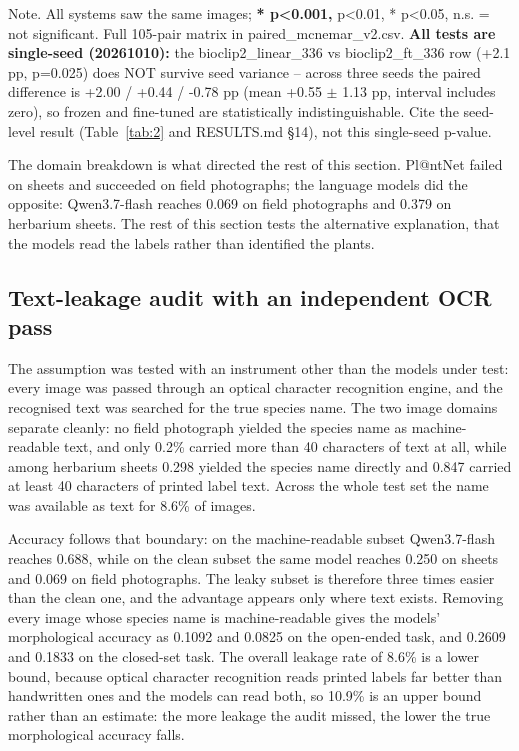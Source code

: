 \documentclass[preprint,12pt,authoryear]{elsarticle}
\begin{document}
\begin{table}[tbp]
\begin{minipage}{\linewidth}
Note. All systems saw the same images; \textbf{* p\textless{}0.001, } p\textless{}0.01, * p\textless{}0.05, n.s. = not significant. Full 105-pair matrix in paired\_mcnemar\_v2.csv. \textbf{All tests are single-seed (20261010):} the bioclip2\_linear\_336 vs bioclip2\_ft\_336 row (+2.1 pp, p=0.025) does NOT survive seed variance -- across three seeds the paired difference is +2.00 / +0.44 / -0.78 pp (mean +0.55 $\pm$ 1.13 pp, interval includes zero), so frozen and fine-tuned are statistically indistinguishable. Cite the seed-level result (Table~\ref{tab:2} and RESULTS.md \S{}14), not this single-seed p-value.
\end{minipage}
\end{table}

The domain breakdown is what directed the rest of this section. Pl@ntNet failed on sheets and succeeded on field photographs; the language models did the opposite: Qwen3.7-flash reaches 0.069 on field photographs and 0.379 on herbarium sheets. The rest of this section tests the alternative explanation, that the models read the labels rather than identified the plants.

\setcounter{section}{7}

\setcounter{subsection}{2}

\subsection{Text-leakage audit with an independent OCR pass}\label{sec:7.3}

The assumption was tested with an instrument other than the models under test: every image was passed through an optical character recognition engine, and the recognised text was searched for the true species name. The two image domains separate cleanly: no field photograph yielded the species name as machine-readable text, and only 0.2\% carried more than 40 characters of text at all, while among herbarium sheets 0.298 yielded the species name directly and 0.847 carried at least 40 characters of printed label text. Across the whole test set the name was available as text for 8.6\% of images.

Accuracy follows that boundary: on the machine-readable subset Qwen3.7-flash reaches 0.688, while on the clean subset the same model reaches 0.250 on sheets and 0.069 on field photographs. The leaky subset is therefore three times easier than the clean one, and the advantage appears only where text exists. Removing every image whose species name is machine-readable gives the models' morphological accuracy as 0.1092 and 0.0825 on the open-ended task, and 0.2609 and 0.1833 on the closed-set task. The overall leakage rate of 8.6\% is a lower bound, because optical character recognition reads printed labels far better than handwritten ones and the models can read both, so 10.9\% is an upper bound rather than an estimate: the more leakage the audit missed, the lower the true morphological accuracy falls.
\end{document}
